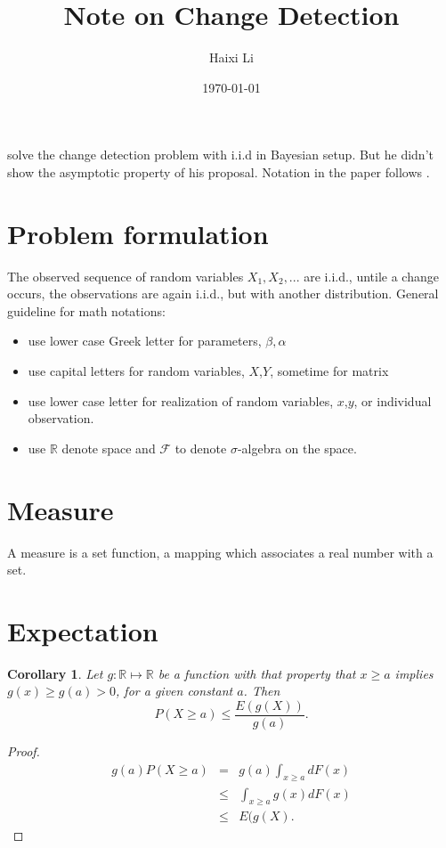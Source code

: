 \documentclass[a4paper]{article}
\title{Note on Change Detection}
\author{Haixi Li}
\date{\today}
\theoremstyle{plain}
\newtheorem{corollary}{Corollary}[section]
\begin{document}
\maketitle
\cite{Shiryaev1963_Optimum_Method,Shiryaev1978} solve the change detection problem with i.i.d in Bayesian setup. But he didn't show the asymptotic property of his proposal.
Notation in the paper follows \cite{Tartakovsky2005}.
\section{Problem formulation}
The observed sequence of random variables $X_{1},X_{2},...$ are i.i.d., untile a change occurs, the observations are again i.i.d., but with another distribution.
General guideline for math notations:
\begin{itemize}
    \item use lower case Greek letter for parameters, $\beta ,\alpha $
    \item use capital letters for random variables, $X$,$Y$, sometime for matrix
    \item use lower case letter for realization of random variables, $x$,$y$, or individual observation.
    \item use $\mathbb{R}$ denote space and $\mathcal{F}$ to denote $\sigma$-algebra on the space.
\end{itemize}
\section{Measure}
A measure is a set function, a mapping which associates a real number with a set.
\cite{Davidson1994}
\section{Expectation}
\begin{corollary}
Let $g:\mathbb{R}\mapsto \mathbb{R}$ be a function with that property that $x\geq a$ implies $g(x)\geq g(a)>0$, for a given constant $a$. Then 
\[
P(X\geq a) \leq \frac{E(g(X))}{g(a)}.
\]
\end{corollary}
\begin{proof}
\begin{eqnarray*}
g(a)P(X\geq a) &=& g(a)\int_{x\geq a} dF(x)\\
               &\leq& \int_{x\geq a}g(x)dF(x) \\
               &\leq& E(g(X).
\end{eqnarray*}
\end{proof}
\end{document}
